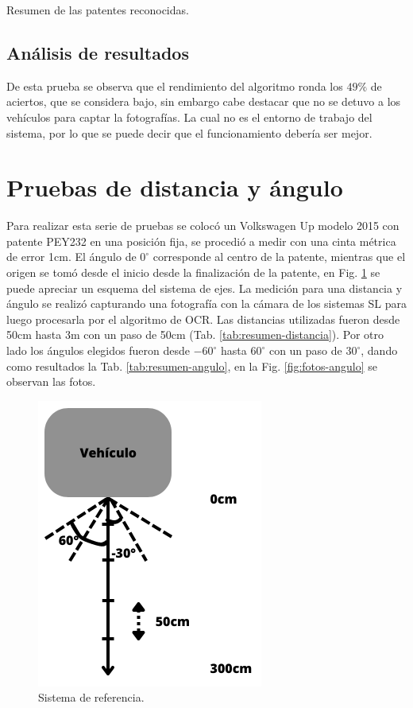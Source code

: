 \begin{table}
    \centering
    
    \caption{Resumen de las patentes reconocidas.}
    \label{tab:resumen-patente}
\end{table}

\subsection{Análisis de resultados}

De esta prueba se observa que el rendimiento del algoritmo ronda los $49\%$ de aciertos, que se considera bajo, sin embargo cabe destacar que no se detuvo a los vehículos para captar la fotografías. La cual no es el entorno de trabajo del sistema, por lo que se puede decir que el funcionamiento debería ser mejor.

\section{Pruebas de distancia y ángulo}

Para realizar esta serie de pruebas se colocó un Volkswagen Up modelo 2015 con patente PEY232 en una posición fija, se procedió a medir con una cinta métrica de error 1cm. El ángulo de $0^\circ$ corresponde al centro de la patente, mientras que el origen se tomó desde el inicio desde la finalización de la patente, en Fig. \ref{fig:sistema-medicion-angulos} se puede apreciar un esquema del sistema de ejes. La medición para una distancia y ángulo se realizó capturando una fotografía con la cámara de los sistemas SL para luego procesarla por el algoritmo de OCR. Las distancias utilizadas fueron desde 50cm hasta 3m con un paso de 50cm (Tab. \ref{tab:resumen-distancia}). Por otro lado los ángulos elegidos fueron desde $-60^\circ$ hasta $60^\circ$ con un paso de $30^\circ$, dando como resultados la Tab. \ref{tab:resumen-angulo}, en la Fig. \ref{fig:fotos-angulo} se observan las fotos.

\begin{figure}
    \centering
    \includegraphics[width=.3\textwidth]{imgs/sistema-referencia.png}
    \caption{Sistema de referencia.}
    \label{fig:sistema-medicion-angulos}
\end{figure}

